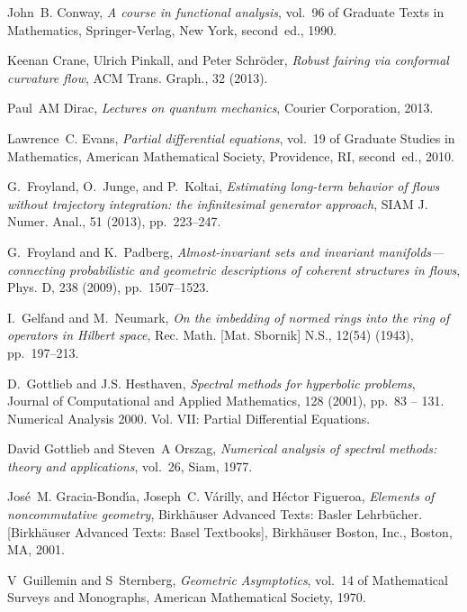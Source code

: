 \documentclass[final,leqno]{amsart}
\begin{document}
\begin{thebibliography}{10}
{\sc John~B. Conway}, {\em A course in functional analysis}, vol.~96 of
  Graduate Texts in Mathematics, Springer-Verlag, New York, second~ed., 1990.

{\sc Keenan Crane, Ulrich Pinkall, and Peter Schr\"{o}der}, {\em Robust fairing
  via conformal curvature flow}, ACM Trans. Graph., 32 (2013).

{\sc Paul~AM Dirac}, {\em Lectures on quantum mechanics}, Courier Corporation,
  2013.

{\sc Lawrence~C. Evans}, {\em Partial differential equations}, vol.~19 of
  Graduate Studies in Mathematics, American Mathematical Society, Providence,
  RI, second~ed., 2010.

{\sc G.~Froyland, O.~Junge, and P.~Koltai}, {\em Estimating long-term behavior
  of flows without trajectory integration: the infinitesimal generator
  approach}, SIAM J. Numer. Anal., 51 (2013), pp.~223--247.

{\sc G.~Froyland and K.~Padberg}, {\em Almost-invariant sets and invariant
  manifolds---connecting probabilistic and geometric descriptions of coherent
  structures in flows}, Phys. D, 238 (2009), pp.~1507--1523.

{\sc I.~Gelfand and M.~Neumark}, {\em On the imbedding of normed rings into the
  ring of operators in {H}ilbert space}, Rec. Math. [Mat. Sbornik] N.S., 12(54)
  (1943), pp.~197--213.

{\sc D.~Gottlieb and J.S. Hesthaven}, {\em Spectral methods for hyperbolic
  problems}, Journal of Computational and Applied Mathematics, 128 (2001),
  pp.~83 -- 131.
\newblock Numerical Analysis 2000. Vol. VII: Partial Differential Equations.

{\sc David Gottlieb and Steven~A Orszag}, {\em Numerical analysis of spectral
  methods: theory and applications}, vol.~26, Siam, 1977.

{\sc Jos{\'e}~M. Gracia-Bond{\'{\i}}a, Joseph~C. V{\'a}rilly, and H{\'e}ctor
  Figueroa}, {\em Elements of noncommutative geometry}, Birkh\"auser Advanced
  Texts: Basler Lehrb\"ucher. [Birkh\"auser Advanced Texts: Basel Textbooks],
  Birkh\"auser Boston, Inc., Boston, MA, 2001.

{\sc V~Guillemin and S~Sternberg}, {\em Geometric Asymptotics}, vol.~14 of
  Mathematical Surveys and Monographs, American Mathematical Society, 1970.


\end{thebibliography}
\end{document}
